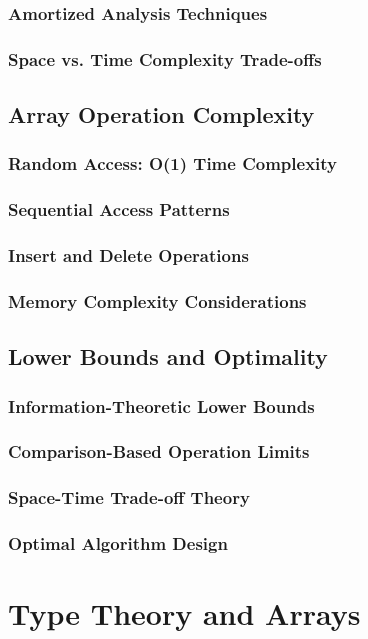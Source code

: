 \documentclass[12pt, oneside]{book}
\begin{document}
\subsubsection{Amortized Analysis Techniques}
\subsubsection{Space vs. Time Complexity Trade-offs}

\subsection{Array Operation Complexity}
\subsubsection{Random Access: O(1) Time Complexity}
\subsubsection{Sequential Access Patterns}
\subsubsection{Insert and Delete Operations}
\subsubsection{Memory Complexity Considerations}

\subsection{Lower Bounds and Optimality}
\subsubsection{Information-Theoretic Lower Bounds}
\subsubsection{Comparison-Based Operation Limits}
\subsubsection{Space-Time Trade-off Theory}
\subsubsection{Optimal Algorithm Design}

\section{Type Theory and Arrays}
\end{document}
